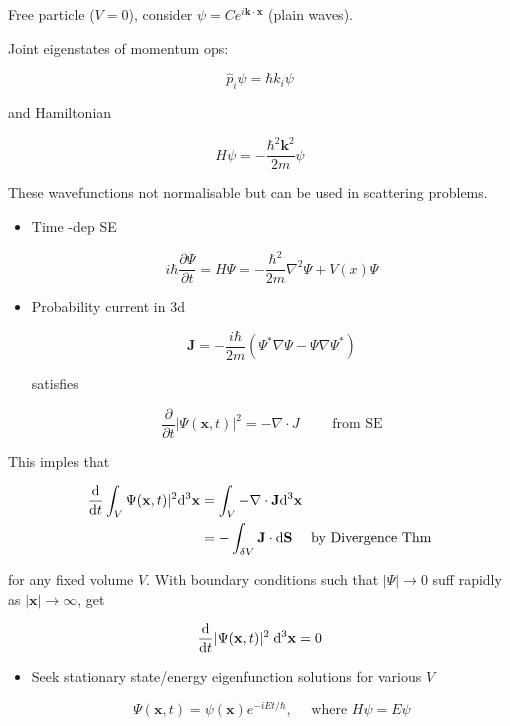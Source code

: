 \documentclass[a4paper]{article}
\begin{document}
\begin{eg}
	Free particle ($ V = 0 $), consider $ \psi = C e^{i \mathbf{k} \cdot \mathbf{x}} $ (plain waves). 
	
	Joint eigenstates of momentum ops: 
	
	\[ \hat{p}_{i} \psi = \hbar k_{i} \psi \]
	
	and Hamiltonian
	
	\[ H \psi = - \frac{\hbar^{2} \mathbf{k}^{2} }{2m} \psi \]
	
	These wavefunctions not normalisable but can be used in scattering problems.
\end{eg}


\begin{itemize}
	\item Time -dep SE
	
	\[ i \hbar \frac{\partial \Psi }{\partial t} = H \Psi = - \frac{\hbar^{2}}{2m} \nabla^{2} \Psi + V(x) \Psi  \]
	
	\item Probability current in 3d
	
	\[ \mathbf{J} = - \frac{i \hbar}{2m}  ( \Psi^{*} \nabla \Psi  - \Psi \nabla \Psi^{*}  )  \]
	
	satisfies
	
	\[ \frac{\partial }{\partial t}  |  \Psi(\mathbf{x},t) |^{2} = - \nabla \cdot J  \qquad \text{ from SE} \] 
	
\end{itemize}

This imples that

\begin{align*}
\frac{\mathrm{d} }{\mathrm{d} t}  \int_{V}   \Psi(\mathbf{x},t) |^{2} \mathrm{d}^{3} \mathbf{x}  & =  \int_{V} - \nabla \cdot \mathbf{J} \mathrm{d}^{3} \mathbf{x} \\
& = - \int_{\delta V} \mathbf{J} \cdot \mathrm{d} \mathbf{S} \quad \text{ by Divergence Thm}
\end{align*}

for any fixed volume $ V $. With boundary conditions such that $ | \Psi | \to 0 $ suff rapidly as $ | \mathbf{x} | \to \infty $, get 

\[ \frac{\mathrm{d} }{\mathrm{d} t}  | \Psi(\mathbf{x},t) |^{2} \; \mathrm{d}^{3} \mathbf{x}  = 0 \]

\begin{itemize}
	\item Seek stationary state/energy eigenfunction solutions for various $ V $
	
	\[ \Psi(\mathbf{x},t) = \psi(\mathbf{x}) e^{-i E t / \hbar}, \quad \text{ where } H \psi = E \psi   \]
\end{itemize}
\end{document}
